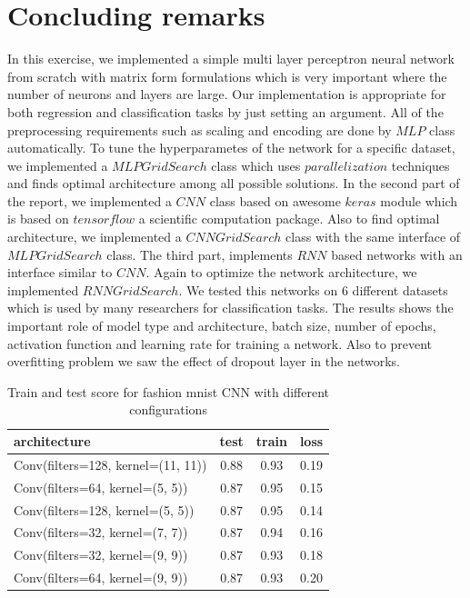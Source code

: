 \documentclass[10pt]{SelfArx} %
\begin{document}
\section{Concluding remarks}
In this exercise, we implemented a simple multi layer perceptron neural network from scratch with matrix form formulations which is very important where the number of neurons and layers are large. Our implementation is appropriate for both regression and classification tasks by just setting an argument. All of the preprocessing requirements such as scaling and encoding are done by $MLP$ class automatically. To tune the hyperparametes of the network for a specific dataset, we implemented a $MLPGridSearch$ class which uses $parallelization$ techniques and finds optimal architecture among all possible solutions. In the second part of the report, we implemented a $CNN$ class based on awesome $keras$ module which is based on $tensorflow$ a scientific computation package. Also to find optimal architecture, we implemented a $CNNGridSearch$ class with the same interface of $MLPGridSearch$ class. The third part, implements $RNN$ based networks with an interface similar to $CNN$. Again to optimize the network architecture, we implemented $RNNGridSearch$. We tested this networks on 6 different datasets which is used by many researchers for classification tasks. The results shows the important role of model type and architecture, batch size, number of epochs, activation function and learning rate for training a network. Also to prevent overfitting problem we saw the effect of dropout layer in the networks. 

\begin{table}[]
	\begin{tabular*}{1\linewidth}{@{\extracolsep{\fill} }lccc@{}}
		\toprule
		architecture & test & train & loss \\ \midrule
		Conv(filters=128, kernel=(11, 11)) & 0.88 & 0.93 & 0.19 \\
		Conv(filters=64, kernel=(5, 5)) & 0.87 & 0.95 & 0.15 \\
		Conv(filters=128, kernel=(5, 5)) & 0.87 & 0.95 & 0.14 \\
		Conv(filters=32, kernel=(7, 7)) & 0.87 & 0.94 & 0.16 \\
		Conv(filters=32, kernel=(9, 9)) & 0.87 & 0.93 & 0.18 \\
		Conv(filters=64, kernel=(9, 9)) & 0.87 & 0.93 & 0.20 \\ \bottomrule
	\end{tabular*}
	\caption{Train and test score for fashion mnist CNN  with different configurations}
	\label{tfashion1}
\end{table}
\end{document}
